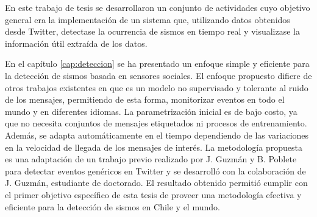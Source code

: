 \begin{conclusion}
\label{cap:conclusion}	


En este trabajo de tesis se desarrollaron un conjunto de actividades cuyo objetivo general era la implementación de un sistema que, utilizando datos obtenidos desde Twitter, detectase la ocurrencia de sismos en tiempo real y visualizase la información útil extraída de los datos.

En el capítulo \ref{cap:deteccion} se ha presentado un enfoque simple y eficiente para la detección de sismos basada en sensores sociales. 
%
El enfoque propuesto difiere de otros trabajos existentes en que es un modelo no supervisado y tolerante al ruido de los mensajes, permitiendo de esta forma, monitorizar eventos en todo el mundo y en diferentes idiomas. 
%
La parametrización inicial es de bajo costo, ya que no necesita conjuntos de mensajes etiquetados ni procesos de entrenamiento. 
%
Además, se adapta automáticamente en el tiempo dependiendo de las variaciones en la velocidad de llegada de los mensajes de interés.
%
La metodología propuesta es una adaptación de un trabajo previo realizado por J. Guzmán y B. Poblete para detectar eventos genéricos en Twitter y se desarrolló con la colaboración de J. Guzmán, estudiante de doctorado. 
%
El resultado obtenido permitió cumplir con el primer objetivo específico de esta tesis de proveer una metodología efectiva y eficiente para la detección de sismos en Chile y el mundo. 



\end{conclusion}
